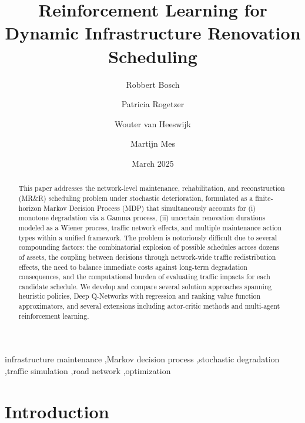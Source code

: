 \documentclass[3p, twocolumn]{elsarticle}
\begin{document}
\begin{frontmatter}

\title{Reinforcement Learning for Dynamic Infrastructure Renovation Scheduling}

\author[inst1]{Robbert Bosch}%
\author[inst1]{Patricia Rogetzer} %
\author[inst1]{Wouter van Heeswijk} %
\author[inst1]{Martijn Mes} %
\date{March 2025}


\begin{abstract}
This paper addresses the network-level maintenance, rehabilitation, and reconstruction (MR\&R) scheduling problem under stochastic deterioration, formulated as a finite-horizon Markov Decision Process (MDP) that simultaneously accounts for (i) monotone degradation via a Gamma process, (ii) uncertain renovation durations modeled as a Wiener process, traffic network effects, and multiple maintenance action types within a unified framework. The problem is notoriously difficult due to several compounding factors: the combinatorial explosion of possible schedules across dozens of assets, the coupling between decisions through network-wide traffic redistribution effects, the need to balance immediate costs against long-term degradation consequences, and the computational burden of evaluating traffic impacts for each candidate schedule. We develop and compare several solution approaches spanning heuristic policies, Deep Q-Networks with regression and ranking value function approximators, and several extensions including actor-critic methods and multi-agent reinforcement learning.
\end{abstract}



\begin{keyword}
infrastructure maintenance \sep Markov decision process \sep stochastic degradation \sep traffic simulation \sep road network \sep optimization
\end{keyword}

\end{frontmatter}

\section{Introduction}
\label{sec:introduction}
\end{document}
